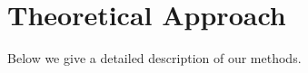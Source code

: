 


\section{Theoretical Approach}\label{section:theory}
Below we give a detailed description of our methods.

